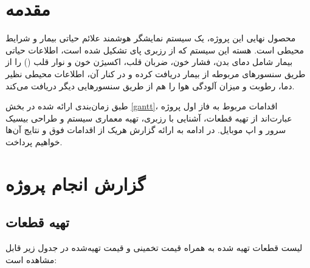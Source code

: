 \documentclass[12pt]{article}
\begin{document}
\newpage
\pagestyle{fancy}
\fancyhf{}
\fancyfoot{}
\cfoot{\thepage}
\chead{}

\newfontfamily{}

\KashidaOff
 \newcommand{\inlineLatin}[1]{
	\small{\lr{{\terminal #1}}}
}


\tableofcontents
\listoffigures
\listoftables

\newpage
\section{مقدمه}


محصول نهایی این پروژه، یک سیستم نمایشگر هوشمند علائم حیاتی بیمار و شرایط محیطی است. هسته این سیستم که از رزبری پای تشکیل شده است، اطلاعات حیاتی بیمار شامل دمای بدن، فشار خون، ضربان قلب، اکسیژن خون و نوار قلب () را از طریق سنسور‌های مربوطه از بیمار دریافت کرده و در کنار آن، اطلاعات محیطی نظیر دما،‌ رطوبت و میزان آلودگی هوا را هم از طریق سنسورهایی دیگر دریافت می‌کند.

طبق زمان‌بندی ارائه شده در بخش \ref{gantt}، اقدامات مربوط به فاز اول پروژه عبارت‌اند از تهیه قطعات، آشنایی با رزبری، تهیه معماری سیستم و طراحی بیسیک سرور و اپ موبایل.
در ادامه به ارائه گزارش هریک از اقدامات فوق و نتایج آن‌ها خواهیم پرداخت.

\section{گزارش انجام پروژه}
\subsection{تهیه قطعات}

لیست قطعات تهیه شده به همراه قیمت تخمینی و قیمت تهیه‌شده در جدول زیر قابل مشاهده است:
\end{document}
